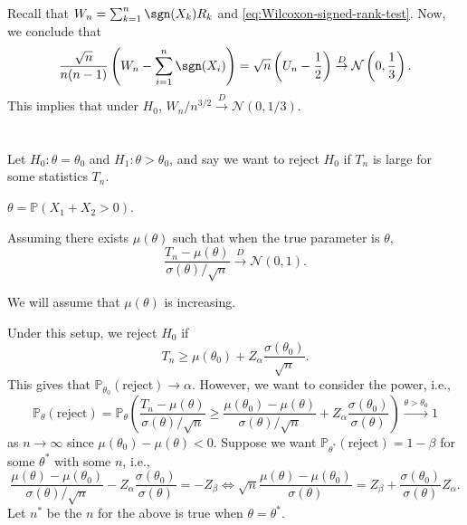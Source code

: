 \begin{remark}
	Recall that \(W_n = \sum_{k=1}^{n} \sgn (X_k) R_k\) and \autoref{eq:Wilcoxon-signed-rank-test}. Now, we conclude that
	\[
		\frac{\sqrt{n}}{n(n-1)} \left( W_n - \sum_{i=1}^{n} \sgn (X_i) \right)
		= \sqrt{n} \left( U_n - \frac{1}{2} \right)
		\overset{D}{\to} \mathcal{N} \left( 0, \frac{1}{3} \right).
	\]
	This implies that under \(H_0\), \(W_n / n^{3 / 2} \overset{D}{\to} \mathcal{N} (0, 1 / 3)\).
\end{remark}

\section{}
Let \(H_0 \colon \theta = \theta _0\) and \(H_1 \colon \theta > \theta _0\), and say we want to reject \(H_0\) if \(T_n\) is large for some statistics \(T_n\).

\begin{eg}
	\(\theta = \mathbb{P} (X_1 + X_2 > 0)\).
\end{eg}

Assuming there exists \(\mu (\theta )\) such that when the true parameter is \(\theta \),
\[
	\frac{T_n - \mu (\theta )}{\sigma (\theta ) / \sqrt{n} }
	\overset{D}{\to} \mathcal{N} (0, 1).
\]

\begin{note}
	We will assume that \(\mu (\theta )\) is increasing.
\end{note}

Under this setup, we reject \(H_0\) if
\[
	T_n \geq \mu (\theta _0) + Z_\alpha \frac{\sigma (\theta _0)}{\sqrt{n} }.
\]
This gives that \(\mathbb{P} _{\theta _0}(\text{reject} ) \to \alpha \). However, we want to consider the power, i.e.,
\[
	\mathbb{P} _{\theta }(\text{reject} )
	= \mathbb{P} _{\theta }\left( \frac{T_n - \mu (\theta )}{\sigma (\theta ) / \sqrt{n} } \geq \frac{\mu (\theta _0) - \mu (\theta )}{\sigma (\theta ) / \sqrt{n} } + Z_\alpha \frac{\sigma (\theta _0)}{\sigma (\theta )} \right)
	\overset{\theta > \theta _0}{\to } 1
\]
as \(n \to \infty \) since \(\mu (\theta _0) - \mu (\theta ) < 0\). Suppose we want \(\mathbb{P} _{\theta ^{\ast} }(\text{reject} ) = 1 - \beta \) for some \(\theta ^{\ast} \) with some \(n\), i.e.,
\[
	\frac{\mu (\theta ) - \mu (\theta _0)}{\sigma (\theta ) / \sqrt{n} } - Z_\alpha \frac{\sigma (\theta _0)}{\sigma (\theta )}
	= -Z_\beta
	\iff \sqrt{n} \frac{\mu (\theta ) - \mu (\theta _0)}{\sigma (\theta )} = Z_\beta + \frac{\sigma (\theta _0)}{\sigma (\theta )} Z_\alpha.
\]
Let \(n^{\ast} \) be the \(n\) for the above is true when \(\theta = \theta ^{\ast} \).

